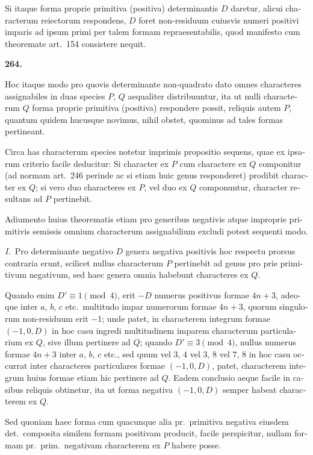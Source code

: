 \documentclass[12pt,a4paper]{article}
\theoremstyle{plain}
\theoremstyle{definition}
\theoremstyle{remark}
\begin{document}
\begin{otherlanguage}{latin}
Si itaque forma proprie primitiva (positiva) determinantis $D$ daretur, alicui characterum reiectorum respondens, $D$ foret non-residuum cuiusvis numeri positivi imparis ad ipsum primi per talem formam repraesentabilis, quod manifesto cum theoremate art.\ 154 consistere nequit.

\smallskip

\textbf{264.}

Hoc itaque modo pro quovis determinante non-quadrato dato omnes characteres assignabiles in duas species $P$, $Q$ aequaliter distribuuntur, ita ut nulli characterum $Q$ forma proprie primitiva (positiva) respondere possit, reliquis autem $P$, quantum quidem hucusque novimus, nihil obstet, quominus ad tales formas pertineant.

Circa has characterum species notetur imprimis propositio sequens, quae ex ipsarum criterio facile deducitur: Si character ex $P$ cum charactere ex $Q$ componitur (ad normam art.\ 246 perinde ac si etiam huic genus responderet) prodibit character ex $Q$; si vero duo characteres ex $P$, vel duo ex $Q$ componuntur, character resultans ad $P$ pertinebit.

Adiumento huius theorematis etiam pro generibus negativis atque improprie primitivis semissis omnium characterum assignabilium excludi potest sequenti modo.

\textit{I.}\ Pro determinante negativo $D$ genera negativa positivis hoc respectu prorsus contraria erunt, scilicet nullus characterum $P$ pertinebit ad genus pro prie primitivum negativum, sed haec genera omnia habebunt characteres ex $Q$.

Quando enim $D' \equiv 1 \pmod{4}$, erit $-D$ numerus positivus formae $4n+3$, adeoque inter $a$, $b$, $c$ etc.\ multitudo impar numerorum formae $4n+3$, quorum singulorum non-residuum erit $-1$; unde patet, in characterem integrum formae $(-1, 0, D)$ in hoc casu ingredi multitudinem imparem characterum particularium ex $Q$, sive illum pertinere ad $Q$; quando $D' \equiv 3 \pmod{4}$, nullus numerus formae $4n+3$ inter $a$, $b$, $c$ etc., sed quum vel $3$, $4$ vel $3$, $8$ vel $7$, $8$ in hoc casu occurrat inter characteres particulares formae $(-1, 0, D)$, patet, characterem integrum huius formae etiam hic pertinere ad $Q$. Eadem conclusio aeque facile in casibus reliquis obtinetur, ita ut forma negativa $(-1, 0, D)$ semper habeat characterem ex $Q$.

Sed quoniam haec forma cum quacunque alia pr.\ primitiva negativa eiusdem det.\ composita similem formam positivam producit, facile perspicitur, nullam formam pr.\ prim.\ negativam characterem ex $P$ habere posse.


\end{otherlanguage}
\end{document}

